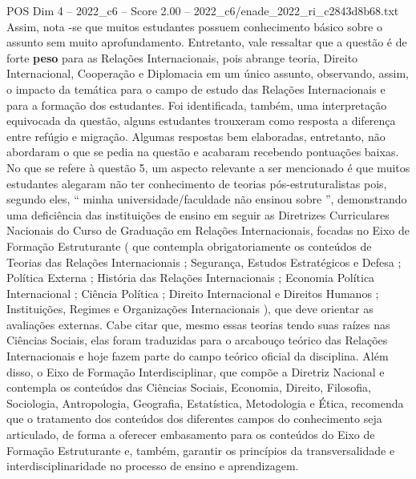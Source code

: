 \begin{textsample}{POS Dim 4 – 2022\_c6 – Score 2.00 – 2022\_c6/enade\_2022\_ri\_c2843d8b68.txt}
Assim, nota -se que muitos estudantes possuem conhecimento básico sobre o assunto sem muito aprofundamento.
Entretanto, vale ressaltar que a questão é de forte \textbf{peso} para as Relações Internacionais, pois abrange teoria, Direito Internacional, Cooperação e Diplomacia em um único assunto, observando, assim, o impacto da temática para o campo de estudo das Relações Internacionais e para a formação dos estudantes.
Foi identificada, também, uma interpretação equivocada da questão, alguns estudantes trouxeram como resposta a diferença entre refúgio e migração.
Algumas respostas bem elaboradas, entretanto, não abordaram o que se pedia na questão e acabaram recebendo pontuações baixas.
No que se refere à questão 5, um aspecto relevante a ser mencionado é que muitos estudantes alegaram não ter conhecimento de teorias pós-estruturalistas pois, segundo eles, “ minha universidade/faculdade não ensinou sobre ”, demonstrando uma deficiência das instituições de ensino em seguir as Diretrizes Curriculares Nacionais do Curso de Graduação em Relações Internacionais, focadas no Eixo de Formação Estruturante ( que contempla obrigatoriamente os conteúdos de Teorias das Relações Internacionais ; Segurança, Estudos Estratégicos e Defesa ; Política Externa ; História das Relações Internacionais ; Economia Política Internacional ; Ciência Política ; Direito Internacional e Direitos Humanos ; Instituições, Regimes e Organizações Internacionais ), que deve orientar as avaliações externas.
Cabe citar que, mesmo essas teorias tendo suas raízes nas Ciências Sociais, elas foram traduzidas para o arcabouço teórico das Relações Internacionais e hoje fazem parte do campo teórico oficial da disciplina.
Além disso, o Eixo de Formação Interdisciplinar, que compõe a Diretriz Nacional e contempla os conteúdos das Ciências Sociais, Economia, Direito, Filosofia, Sociologia, Antropologia, Geografia, Estatística, Metodologia e Ética, recomenda que o tratamento dos conteúdos dos diferentes campos do conhecimento seja articulado, de forma a oferecer embasamento para os conteúdos do Eixo de Formação Estruturante e, também, garantir os princípios da transversalidade e interdisciplinaridade no processo de ensino e aprendizagem.

\end{textsample}
